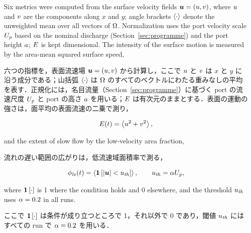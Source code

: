 \begin{en}[M5-1]
Six metrics were computed from the surface velocity fields $\boldsymbol{u} = (u, v)$, where $u$ and $v$ are the components along $x$ and $y$; angle brackets $\left\langle \cdot \right\rangle$ denote the unweighted mean over all vectors of $\Omega$. Normalization uses the port velocity scale $U_{\mathit{p}}$ based on the nominal discharge (Section~\ref{sec:programme}) and the port height $a$; $E$ is kept dimensional. The intensity of the surface motion is measured by the area-mean squared surface speed,
\end{en}
\begin{ja}
六つの指標を，表面流速場 $\boldsymbol{u} = (u, v)$ から計算し，ここで $u$ と $v$ は $x$ と $y$ に沿う成分である；山括弧 $\left\langle \cdot \right\rangle$ は $\Omega$ のすべてのベクトルにわたる重みなしの平均を表す．正規化には，名目流量（Section~\ref{sec:programme}）に基づく port の流速尺度 $U_{\mathit{p}}$ と port の高さ $a$ を用いる；$E$ は有次元のままとする．表面の運動の強さは，面平均の表面流速の二乗で測り，
\end{ja}
\begin{equation}
E(t) = \left\langle u^{2} + v^{2} \right\rangle ,
\label{eq:E}
\end{equation}
\begin{en}
and the extent of slow flow by the low-velocity area fraction,
\end{en}
\begin{ja}
流れの遅い範囲の広がりは，低流速域面積率で測る，
\end{ja}
\begin{equation}
\phi_{\mathit{lv}}(t) = \left\langle \mathbf{1}\left[|\boldsymbol{u}| < u_{\mathit{th}}\right] \right\rangle , \qquad u_{\mathit{th}} = \alpha U_{\mathit{p}} ,
\label{eq:philv}
\end{equation}
\begin{en}
where $\mathbf{1}\left[\cdot\right]$ is 1 where the condition holds and 0 elsewhere, and the threshold $u_{\mathit{th}}$ uses $\alpha = 0.2$ in all runs.
\end{en}
\begin{ja}
ここで $\mathbf{1}\left[\cdot\right]$ は条件が成り立つところで 1，それ以外で 0 であり，閾値 $u_{\mathit{th}}$ にはすべての run で $\alpha = 0.2$ を用いる．
\end{ja}

